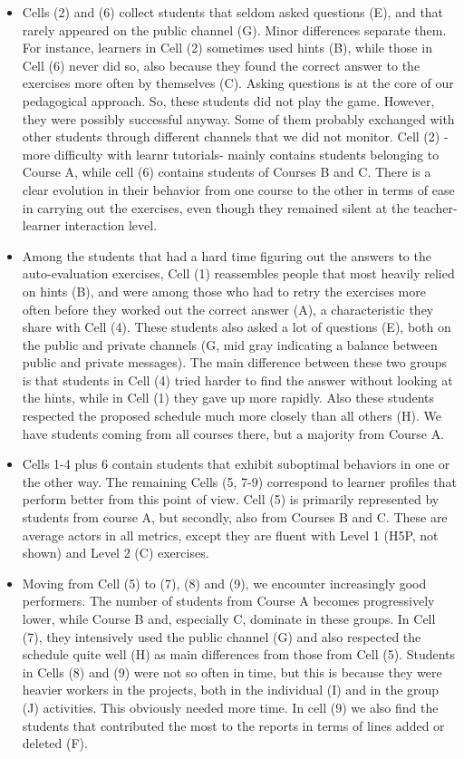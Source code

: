 \documentclass{aims}
\theoremstyle{definition}
\begin{document}
\begin{itemize}
\item
  Cells (2) and (6) collect students that seldom asked questions (E),
  and that rarely appeared on the public channel (G). Minor differences
  separate them. For instance, learners in Cell (2) sometimes used hints
  (B), while those in Cell (6) never did so, also because they found the
  correct answer to the exercises more often by themselves (C). Asking
  questions is at the core of our pedagogical approach. So, these
  students did not play the game. However, they were possibly successful
  anyway. Some of them probably exchanged with other students through
  different channels that we did not monitor. Cell (2) -more difficulty
  with learnr tutorials- mainly contains students belonging to Course A,
  while cell (6) contains students of Courses B and C. There is a clear
  evolution in their behavior from one course to the other in terms of
  ease in carrying out the exercises, even though they remained silent
  at the teacher-learner interaction level.
\item
  Among the students that had a hard time figuring out the answers to
  the auto-evaluation exercises, Cell (1) reassembles people that most
  heavily relied on hints (B), and were among those who had to retry the
  exercises more often before they worked out the correct answer (A), a
  characteristic they share with Cell (4). These students also asked a
  lot of questions (E), both on the public and private channels (G, mid
  gray indicating a balance between public and private messages). The
  main difference between these two groups is that students in Cell (4)
  tried harder to find the answer without looking at the hints, while in
  Cell (1) they gave up more rapidly. Also these students respected the
  proposed schedule much more closely than all others (H). We have
  students coming from all courses there, but a majority from Course A.
\item
  Cells 1-4 plus 6 contain students that exhibit suboptimal behaviors in
  one or the other way. The remaining Cells (5, 7-9) correspond to
  learner profiles that perform better from this point of view. Cell (5)
  is primarily represented by students from course A, but secondly, also
  from Courses B and C. These are average actors in all metrics, except
  they are fluent with Level 1 (H5P, not shown) and Level 2 (C)
  exercises.
\item
  Moving from Cell (5) to (7), (8) and (9), we encounter increasingly
  good performers. The number of students from Course A becomes
  progressively lower, while Course B and, especially C, dominate in
  these groups. In Cell (7), they intensively used the public channel
  (G) and also respected the schedule quite well (H) as main differences
  from those from Cell (5). Students in Cells (8) and (9) were not so
  often in time, but this is because they were heavier workers in the
  projects, both in the individual (I) and in the group (J) activities.
  This obviously needed more time. In cell (9) we also find the students
  that contributed the most to the reports in terms of lines added or
  deleted (F).
\end{itemize}
\end{document}
